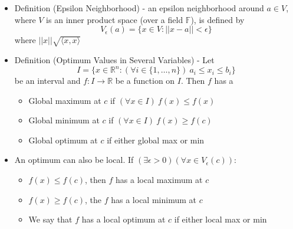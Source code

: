 \documentclass{article}
\begin{document}
\begin{itemize}
    \item Definition (Epsilon Neighborhood) - an epsilon neighborhood around $a \in V$, where $V$ is an inner product space (over a field $\mathbb{F}$), is defined by
    \[
    V_\epsilon(a) = \{ x \in V : \vert \vert x - a \vert \vert < \epsilon \}
    \]
    where $\vert \vert x \vert \vert \sqrt{\langle x, x \rangle}$
    \item Definition (Optimum Values in Several Variables) - Let
    \[
    I = \{ x \in \mathbb{R}^n : (\forall i \in \{1,\dots, n\}) \ a_i \le x_i \le b_i\}
    \]
    be an interval and $f: I \rightarrow \mathbb{R}$ be a function on $I$. Then $f$ has a
    \begin{itemize}
        \item Global maximum at $c$ if $(\forall x \in I) \ f(x) \le f(x)$
        \item Global minimum at $c$ if $(\forall x \in I) \ f(x) \ge f(c)$
        \item Global optimum at $c$ if either global max or min
    \end{itemize}
    \item An optimum can also be local. If $(\exists \epsilon > 0)(\forall x \in V_\epsilon(c))$:
    \begin{itemize}
        \item $f(x) \le f(c)$, then $f$ has a local maximum at $c$
        \item $f(x) \ge f(c)$, the $f$ has a local minimum at $c$
        \item We say that $f$ has a local optimum at $c$ if either local max or min
    \end{itemize}
\end{itemize}
\end{document}
